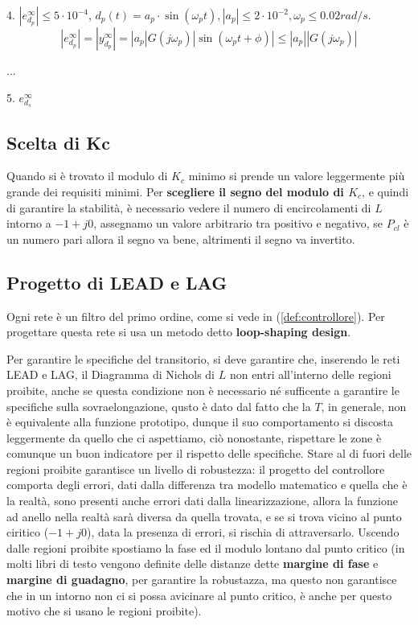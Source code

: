 \documentclass[12pt]{article}
\begin{document}
\begin{problem}{}{}
    4. $|e _{d_p}^{\infty}| \leqslant 5\cdot 10^{-4}$, $d_p(t) = a_p\cdot \sin(\omega_p t), |a_p| \leqslant 2\cdot 10^{-2}, \omega_p \leqslant 0.02 rad/s$.
    \[ |e _{d_p}^{\infty}| = |y^{\infty} _{d_p}| = |a_p |G(j\omega_p)| \sin(\omega_p t + \phi)| \leqslant |a_p| |G(j\omega_p)| \]

    ...

5. $e _{d_s}^{\infty}$

\end{problem}



\subsection{Scelta di Kc}
Quando si \`e trovato il modulo di $K_c$ minimo si prende un valore leggermente pi\`u grande dei requisiti minimi. Per \textbf{scegliere il segno del modulo di $K_c$}, e quindi di garantire la stabilit\`a, \`e necessario vedere il numero di encircolamenti di $L$ intorno a $-1+j0$, assegnamo un valore arbitrario tra positivo e negativo, se $P_{cl}$ \`e un numero pari allora il segno va bene, altrimenti il segno va invertito. 

\subsection{Progetto di LEAD e LAG}
Ogni rete \`e un filtro del primo ordine, come si vede in (\ref{def:controllore}). Per progettare questa rete si usa un metodo detto \textbf{loop-shaping design}.

Per garantire le specifiche del transitorio, si deve garantire che, inserendo le reti LEAD e LAG, il Diagramma di Nichols di $L$ non entri all'interno delle regioni proibite, anche se questa condizione non \`e necessario n\'e sufficente a garantire le specifiche sulla sovraelongazione, qusto \`e dato dal fatto che la $T$, in generale, non \`e equivalente alla funzione prototipo, dunque il suo comportamento si discosta leggermente da quello che ci aspettiamo, ci\`o nonostante, rispettare le zone \`e comunque un buon indicatore per il rispetto delle specifiche. Stare al di fuori delle regioni proibite garantisce un livello di robustezza: il progetto del controllore comporta degli errori, dati dalla differenza tra modello matematico e quella che \`e la realt\`a, sono presenti anche errori dati dalla linearizzazione, allora la funzione ad anello nella realt\`a sar\`a diversa da quella trovata, e se si trova vicino al punto ciritico ($-1 + j0$), data la presenza di errori, si rischia di attraversarlo. Uscendo dalle regioni proibite spostiamo la fase ed il modulo lontano dal punto critico (in molti libri di testo vengono definite delle distanze dette \textbf{margine di fase } e \textbf{margine di guadagno}, per garantire la robustazza, ma questo non garantisce che  in un intorno non ci si possa avicinare al punto critico, \`e anche per questo motivo che si usano le regioni proibite).
\end{document}
